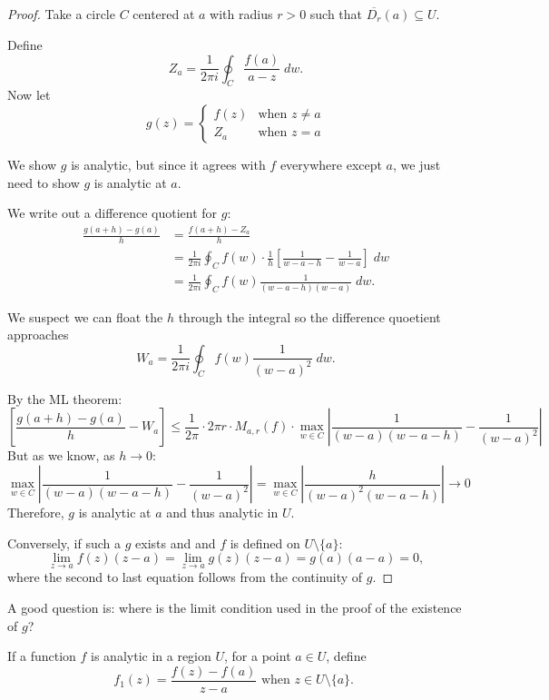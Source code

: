 \begin{proof}
    Take a circle $C$ centered at $a$ with radius $r > 0$ such that
    $\overline{D_r}(a) \subseteq U$.

    Define
    \[ Z_a = \frac{1}{2\pi i} \oint_C \frac{f(a)}{a-z} \; dw. \]
    Now let 
    \[ g(z) = \begin{cases}
            f(z) & \text{when $z \ne a$} \\
            Z_a & \text{when $z=a$}
        \end{cases}
    \]

    We show $g$ is analytic, but since it agrees with $f$
    everywhere except $a$, we just need to show $g$ is analytic
    at $a$.

    We write out a difference quotient for $g$:
    \begin{align*}
        \frac{g(a+h) - g(a)}{h} &= \frac{f(a+h) - Z_a}{h} \\
        &= \frac{1}{2\pi i} \oint_C f(w) \cdot \frac{1}{h}
        \left[ \frac{1}{w-a-h} - \frac{1}{w-a} \right] \; dw \\
        &= \frac{1}{2\pi i} \oint_C f(w) \frac{1}{(w-a-h)(w-a)} \; dw.
    \end{align*}

    We suspect we can float the $h$ through the integral so the 
    difference quoetient approaches
    \[ W_a = \frac{1}{2\pi i} \oint_C f(w) \frac{1}{(w-a)^2} \; dw. \]

    By the ML theorem:
    \[ \left[ \frac{g(a+h) - g(a)}{h} - W_a  \right] \le
        \frac{1}{2\pi} \cdot 2\pi r \cdot M_{a,r}(f) \cdot
        \max_{w \in C} \left| \frac{1}{(w-a)(w-a-h)} - 
    \frac{1}{(w-a)^2} \right| \]
    But as we know, as $ h \to 0$:
    \[ 
        \max_{w \in C} \left| \frac{1}{(w-a)(w-a-h)} - 
    \frac{1}{(w-a)^2} \right| = 
    \max_{w \in C} \left| \frac{h}{(w-a)^2(w-a-h)} \right| \to 0\]
    Therefore, $g$ is analytic at $a$ and thus analytic in $U$.

    \smallbreak
    Conversely, if such a $g$ exists and and $f$ is defined
    on $U \setminus \{ a \}$:
    \[ \lim_{z \to a} f(z)(z-a) = \lim_{z \to a} g(z)(z-a)
    = g(a)(a-a) = 0,\]
    where the second to last equation follows from the continuity of $g$.


\end{proof}

A good question is: where is the limit condition used in the proof
of the existence of $g$?

\smallbreak
\noindent
If a function $f$ is analytic in a region $U$, for a point
$a \in U$, define
\[ f_1(z) = \frac{f(z)-f(a)}{z-a} \text{  when $z \in U \setminus \{a\}$. } \]

